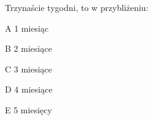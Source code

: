\begin{tresc}
Trzynaście tygodni, to w przybliżeniu:
\end{tresc}
\begin{wariant}{A} 1 miesiąc \end{wariant}
\begin{wariant}{B} 2 miesiące \end{wariant}
\begin{wariant}{C} 3 miesiące \end{wariant}
\begin{wariant}{D} 4 miesiące \end{wariant}
\begin{wariant}{E} 5 miesięcy \end{wariant}
